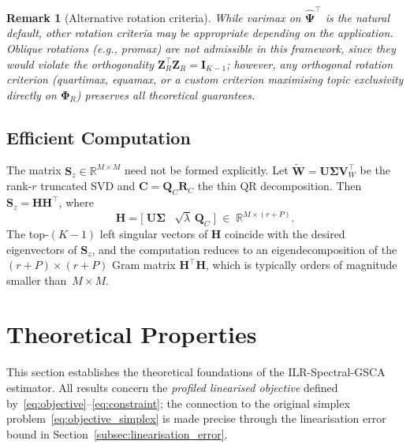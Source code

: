 \documentclass{article}
\newtheorem{remark}{Remark}
\begin{document}
\begin{remark}[Alternative rotation criteria]
\label{rem:alternative_rotations}
While varimax on $\hat{\boldsymbol{\Psi}}^{\!\top}$ is the natural
default, other rotation criteria may be appropriate depending on the
application. Oblique rotations (e.g., promax) are not admissible in
this framework, since they would violate the orthogonality
$\mathbf{Z}_R^{\!\top}\mathbf{Z}_R = \mathbf{I}_{K-1}$; however,
any orthogonal rotation criterion (quartimax, equamax, or a custom
criterion maximising topic exclusivity directly on
$\boldsymbol{\Phi}_R$) preserves all theoretical guarantees.
\end{remark}


\subsection{Efficient Computation}
\label{subsec:computation}

The matrix $\mathbf{S}_z\in\mathbb{R}^{M\times M}$ need not be formed
explicitly. Let
$\widetilde{\mathbf{W}} = \mathbf{U}\boldsymbol{\Sigma}\mathbf{V}_W^{\!\top}$
be the rank-$r$ truncated SVD and
$\mathbf{C} = \mathbf{Q}_C\mathbf{R}_C$ the thin QR decomposition.
Then $\mathbf{S}_z = \mathbf{H}\mathbf{H}^{\!\top}$, where
\begin{equation}
  \mathbf{H}
  = \bigl[\;
      \mathbf{U}\boldsymbol{\Sigma}
      \;\;\;
      \sqrt{\lambda}\,\mathbf{Q}_C
    \;\bigr]
  \;\in\;\mathbb{R}^{M\times(r+P)}.
  \label{eq:H_matrix}
\end{equation}
The top-$(K{-}1)$ left singular vectors of $\mathbf{H}$ coincide with
the desired eigenvectors of $\mathbf{S}_z$, and the computation reduces
to an eigendecomposition of the $(r{+}P)\times(r{+}P)$ Gram matrix
$\mathbf{H}^{\!\top}\mathbf{H}$, which is typically orders of magnitude
smaller than~$M\times M$.



\section{Theoretical Properties}
\label{sec:theory}

This section establishes the theoretical foundations of the ILR-Spectral-GSCA
estimator. All results concern the \emph{profiled linearised objective}
defined by~\eqref{eq:objective}--\eqref{eq:constraint}; the connection
to the original simplex problem~\eqref{eq:objective_simplex} is made
precise through the linearisation error bound in
Section~\ref{subsec:linearisation_error}.
\end{document}
